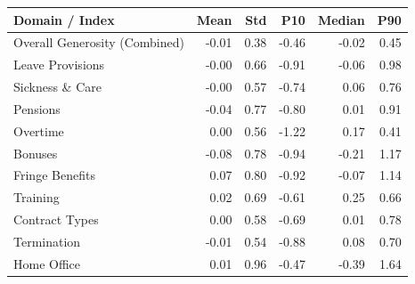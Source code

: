 \begin{tabular}{lrrrrr}
    \hline\hline
    Domain / Index & Mean & Std & P10 & Median & P90 \\
    \hline
    Overall Generosity (Combined) & -0.01 & 0.38 & -0.46 & -0.02 & 0.45 \\
    Leave Provisions & -0.00 & 0.66 & -0.91 & -0.06 & 0.98 \\
    Sickness \& Care & -0.00 & 0.57 & -0.74 & 0.06 & 0.76 \\
    Pensions & -0.04 & 0.77 & -0.80 & 0.01 & 0.91 \\
    Overtime & 0.00 & 0.56 & -1.22 & 0.17 & 0.41 \\
    Bonuses & -0.08 & 0.78 & -0.94 & -0.21 & 1.17 \\
    Fringe Benefits & 0.07 & 0.80 & -0.92 & -0.07 & 1.14 \\
    Training & 0.02 & 0.69 & -0.61 & 0.25 & 0.66 \\
    Contract Types & 0.00 & 0.58 & -0.69 & 0.01 & 0.78 \\
    Termination & -0.01 & 0.54 & -0.88 & 0.08 & 0.70 \\
    Home Office & 0.01 & 0.96 & -0.47 & -0.39 & 1.64 \\
    \hline\hline
\end{tabular}
